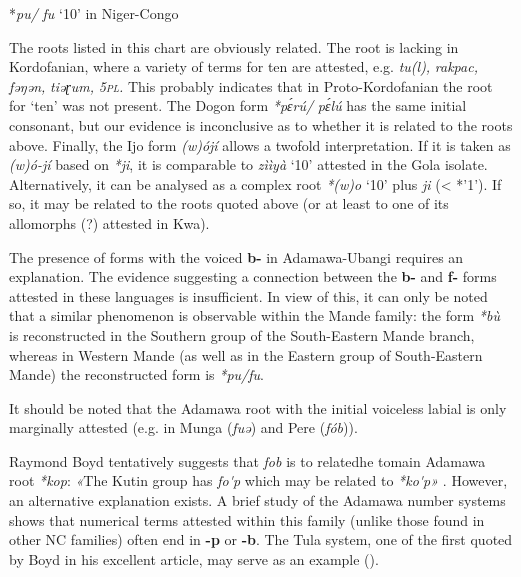 \begin{table}
\caption{\label{tab:4:38}*\textit{pu/} \textit{fu} `10' in Niger-Congo}
\kppyramid
{}
 
\end{table}
The roots listed in this chart are obviously related. The root is lacking in Kordofanian, where a variety of terms for ten are attested, e.g. \textit{tu(l),} \textit{rakpac,} \textit{fəŋən,} \textit{tiəɽum,} \textit{5\textsc{pl}.} This probably indicates that in Proto-Kordofanian the root for ‘ten’ was not present. The Dogon form \textit{*p{\'{ɛ}}r{\'{u}}/} \textit{p{\'{ɛ}}l{\'{u}}} has the same initial consonant, but our evidence is inconclusive as to whether it is related to the roots above. Finally, the Ijo form \textit{(w)ójí} allows a twofold interpretation. If it is taken as \textit{(w)ó-jí} based on \textit{*ji}, it is comparable to \textit{zììyà} ‘10’ attested in the Gola isolate. Alternatively, it can be analysed as a complex root \textit{*(w)o} ‘10’ plus \textit{ji} (< *’1’). If so, it may be related to the roots quoted above (or at least to one of its allomorphs (?) attested in Kwa).

The presence of forms with the voiced \textbf{b-} in Adamawa-Ubangi requires an explanation. The evidence suggesting a connection between the \textbf{b-} and \textbf{f-} forms attested in these languages is insufficient. In view of this, it can only be noted that a similar phenomenon is observable within the Mande family: the form \textit{*b{\`{u}}} is reconstructed in the Southern group of the South-Eastern Mande branch, whereas in Western Mande (as well as in the Eastern group of South-Eastern Mande) the reconstructed form is \textit{*pu/fu}. 

It should be noted that the Adamawa root with the initial voiceless labial is only marginally attested (e.g. in Munga (\textit{fuə}) and Pere (\textit{fób})).

Raymond Boyd tentatively suggests that \textit{fob} is to relatedhe  tomain Adamawa root \textit{*kop}: \textit{«}The Kutin group has \textit{fo\'{}p} which may be related to \textit{*ko\'{}p»} \citep[162]{Boyd1989}. However, an alternative explanation exists. A brief study of the Adamawa number systems shows that numerical terms attested within this family (unlike those found in other NC families) often end in \textbf{-p} or \textbf{-b}. The Tula system, one of the first quoted by Boyd in his excellent article, may serve as an example ().

